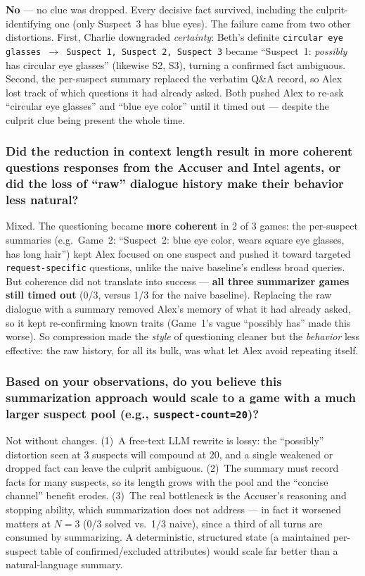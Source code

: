 \documentclass[11pt]{article}
\begin{document}
\textbf{No} --- no clue was dropped. Every decisive fact survived, including the
culprit-identifying one (only Suspect~3 has blue eyes). The failure came from two other
distortions. First, Charlie downgraded \emph{certainty}: Beth's definite
\texttt{circular eye glasses $\rightarrow$ Suspect 1, Suspect 2, Suspect 3} became
``Suspect~1: \emph{possibly} has circular eye glasses'' (likewise S2, S3), turning a
confirmed fact ambiguous. Second, the per-suspect summary replaced the verbatim Q\&A record,
so Alex lost track of which questions it had already asked. Both pushed Alex to re-ask
``circular eye glasses'' and ``blue eye color'' until it timed out --- despite the culprit
clue being present the whole time.

\subsubsection*{Did the reduction in context length result in more coherent questions responses
from the Accuser and Intel agents, or did the loss of ``raw'' dialogue history make their
behavior less natural?}

Mixed. The questioning became \textbf{more coherent} in 2 of 3 games: the per-suspect
summaries (e.g.\ Game~2: ``Suspect~2: blue eye color, wears square eye glasses, has long
hair'') kept Alex focused on one suspect and pushed it toward targeted
\texttt{request-specific} questions, unlike the naive baseline's endless broad queries. But
coherence did not translate into success --- \textbf{all three summarizer games still timed
out} (0/3, versus 1/3 for the naive baseline). Replacing the raw dialogue with a summary
removed Alex's memory of what it had already asked, so it kept re-confirming known traits
(Game~1's vague ``possibly has'' made this worse). So compression made the \emph{style} of
questioning cleaner but the \emph{behavior} less effective: the raw history, for all its
bulk, was what let Alex avoid repeating itself.

\subsubsection*{Based on your observations, do you believe this summarization approach would
scale to a game with a much larger suspect pool (e.g., \texttt{suspect-count=20})?}

Not without changes. (1)~A free-text LLM rewrite is lossy: the ``possibly'' distortion seen
at 3 suspects will compound at 20, and a single weakened or dropped fact can leave the
culprit ambiguous. (2)~The summary must record facts for many suspects, so its length grows
with the pool and the ``concise channel'' benefit erodes. (3)~The real bottleneck is the
Accuser's reasoning and stopping ability, which summarization does not address --- in fact it
worsened matters at $N{=}3$ (0/3 solved vs.\ 1/3 naive), since a third of all turns are
consumed by summarizing. A deterministic, structured state (a
maintained per-suspect table of confirmed/excluded attributes) would scale far better than a
natural-language summary.
\end{document}
